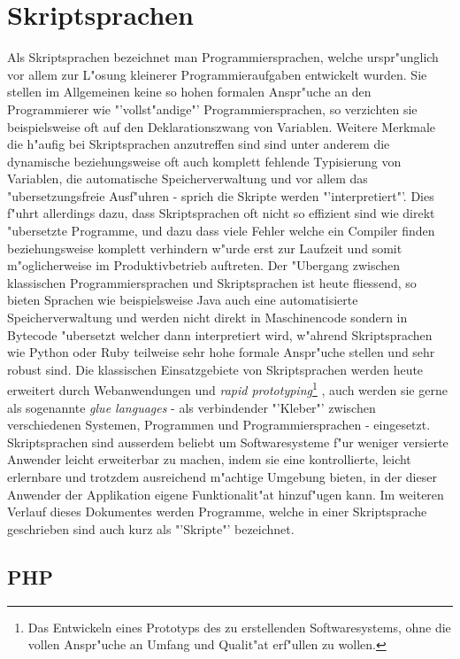 \section{Skriptsprachen}
\label{sec:background:script}

Als Skriptsprachen bezeichnet man Programmiersprachen, welche urspr"unglich vor allem zur L"osung
kleinerer Programmieraufgaben entwickelt wurden. Sie stellen im Allgemeinen keine so hohen formalen 
Anspr"uche an den Programmierer wie "'vollst"andige"' Programmiersprachen, so verzichten sie
beispielsweise oft auf den Deklarationszwang von Variablen. Weitere Merkmale die h"aufig bei
Skriptsprachen anzutreffen sind sind unter anderem die dynamische beziehungsweise oft auch komplett 
fehlende Typisierung von Variablen, die automatische Speicherverwaltung und vor allem das
"ubersetzungsfreie Ausf"uhren - sprich die Skripte werden "'interpretiert"'. Dies f"uhrt allerdings
dazu, dass Skriptsprachen oft nicht so effizient sind wie direkt "ubersetzte Programme, und dazu
dass viele Fehler welche ein Compiler finden beziehungsweise komplett verhindern w"urde erst zur
Laufzeit und somit m"oglicherweise im Produktivbetrieb auftreten.
Der "Ubergang zwischen klassischen Programmiersprachen und Skriptsprachen ist heute fliessend, so 
bieten Sprachen wie beispielsweise Java auch eine automatisierte Speicherverwaltung und werden nicht
direkt in Maschinencode sondern in Bytecode "ubersetzt welcher dann interpretiert wird, w"ahrend 
Skriptsprachen wie Python oder Ruby teilweise sehr hohe formale Anspr"uche stellen und sehr robust sind.
Die klassischen Einsatzgebiete von Skriptsprachen werden heute erweitert durch Webanwendungen und
\emph{rapid prototyping}\footnote{
Das Entwickeln eines Prototyps des zu erstellenden Softwaresystems, ohne die vollen Anspr"uche an Umfang und
Qualit"at erf"ullen zu wollen.
}
, auch werden sie gerne als sogenannte \emph{glue languages}
- als verbindender "'Kleber"' zwischen verschiedenen Systemen, Programmen und Programmiersprachen -
eingesetzt. Skriptsprachen sind ausserdem beliebt um Softwaresysteme f"ur weniger versierte Anwender
leicht erweiterbar zu machen, indem sie eine kontrollierte, leicht erlernbare und trotzdem 
ausreichend m"achtige Umgebung bieten, in der dieser Anwender der Applikation eigene Funktionalit"at 
hinzuf"ugen kann.
Im weiteren Verlauf dieses Dokumentes werden Programme, welche in einer Skriptsprache geschrieben sind 
auch kurz als "'Skripte"' bezeichnet.

\subsection{PHP}
\label{sec:background:php}

